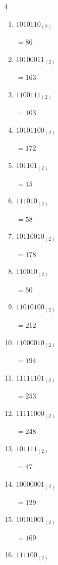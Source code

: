 \begin{multicols}{4}
\begin{enumerate}
        $=154$

  \item $1010110_{(2)}$

        $=86$

  \item $10100011_{(2)}$

        $=163$

  \item $1100111_{(2)}$

        $=103$

  \item $10101100_{(2)}$

        $=172$

  \item $101101_{(2)}$

        $=45$

\columnbreak %

\resetques

  \item $111010_{(2)}$

        $=58$

  \item $10110010_{(2)}$

        $=178$

  \item $110010_{(2)}$

        $=50$

  \item $11010100_{(2)}$

        $=212$

  \item $11000010_{(2)}$

        $=194$

  \item $11111101_{(2)}$

        $=253$

  \item $11111000_{(2)}$

        $=248$

  \item $101111_{(2)}$

        $=47$

  \item $10000001_{(2)}$

        $=129$

  \item $10101001_{(2)}$

        $=169$

  \item $111100_{(2)}$


\end{enumerate}
\end{multicols}
